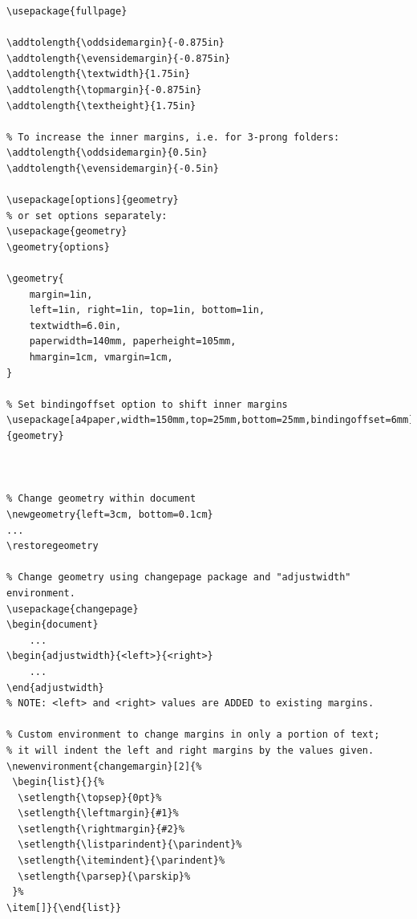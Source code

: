 \documentclass{article}
\begin{document}
\begin{lstlisting}
\usepackage{fullpage}

\addtolength{\oddsidemargin}{-0.875in}
\addtolength{\evensidemargin}{-0.875in}
\addtolength{\textwidth}{1.75in}
\addtolength{\topmargin}{-0.875in}
\addtolength{\textheight}{1.75in}

% To increase the inner margins, i.e. for 3-prong folders:
\addtolength{\oddsidemargin}{0.5in}
\addtolength{\evensidemargin}{-0.5in}

\usepackage[options]{geometry}
% or set options separately:
\usepackage{geometry}
\geometry{options}

\geometry{
    margin=1in,
    left=1in, right=1in, top=1in, bottom=1in,
    textwidth=6.0in,
    paperwidth=140mm, paperheight=105mm,
    hmargin=1cm, vmargin=1cm,
}

% Set bindingoffset option to shift inner margins
\usepackage[a4paper,width=150mm,top=25mm,bottom=25mm,bindingoffset=6mm]{geometry}



% Change geometry within document
\newgeometry{left=3cm, bottom=0.1cm}
...
\restoregeometry

% Change geometry using changepage package and "adjustwidth" environment.
\usepackage{changepage}
\begin{document}
    ...
\begin{adjustwidth}{<left>}{<right>}
    ...
\end{adjustwidth}
% NOTE: <left> and <right> values are ADDED to existing margins.

% Custom environment to change margins in only a portion of text;
% it will indent the left and right margins by the values given.
\newenvironment{changemargin}[2]{%
 \begin{list}{}{%
  \setlength{\topsep}{0pt}%
  \setlength{\leftmargin}{#1}%
  \setlength{\rightmargin}{#2}%
  \setlength{\listparindent}{\parindent}%
  \setlength{\itemindent}{\parindent}%
  \setlength{\parsep}{\parskip}%
 }%
\item[]}{\end{list}}
\end{lstlisting}



\clearpage
\end{document}
